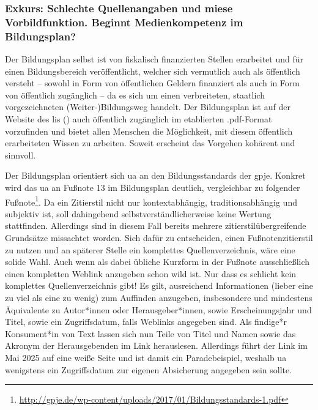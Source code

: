 \subsubsection{Exkurs: Schlechte Quellenangaben und miese Vorbildfunktion. Beginnt Medienkompetenz im Bildungsplan? \label{gpje}}
Der Bildungsplan selbst ist von fiskalisch finanzierten Stellen erarbeitet und für einen Bildungsbereich veröffentlicht, welcher sich vermutlich auch als öffentlich versteht -- sowohl in Form von öffentlichen Geldern finanziert als auch in Form von öffentlich zugänglich -- da es sich um einen verbreiteten, staatlich vorgezeichneten \mbox{(Weiter-)Bildungsweg} %
handelt. Der Bildungsplan ist auf der Website des \gls{lis} (\citeyear[]{LisBildungspläne}) auch öffentlich zugänglich im etablierten .pdf-Format vorzufinden und bietet allen Menschen die Möglichkeit, mit diesem öffentlich erarbeiteten Wissen zu arbeiten.
Soweit erscheint das Vorgehen kohärent und sinnvoll.

Der Bildungsplan orientiert sich \gls{ua} an den Bildungsstandards der \gls{gpje}. Konkret wird das \gls{ua} an Fußnote 13 im Bildungsplan \autocite[][9]{bplan} deutlich, vergleichbar zu folgender Fußnote\footnote{\url{http://gpje.de/wp-content/uploads/2017/01/Bildungsstandards-1.pdf}}. Da ein Zitierstil nicht nur kontextabhängig, traditionsabhängig und subjektiv ist, soll dahingehend selbstverständlicherweise keine Wertung stattfinden. Allerdings sind in diesem Fall bereits mehrere zitierstilübergreifende Grundsätze missachtet worden. Sich dafür zu entscheiden, einen Fußnotenzitierstil zu nutzen und an späterer Stelle ein komplettes Quellenverzeichnis, wäre eine solide Wahl. Auch wenn als dabei übliche Kurzform in der Fußnote ausschließlich einen kompletten Weblink anzugeben schon wild ist. Nur dass es schlicht kein komplettes Quellenverzeichnis gibt!  
Es gilt, ausreichend Informationen (lieber eine zu viel als eine zu wenig) zum Auffinden anzugeben, insbesondere und mindestens Äquivalente zu Autor*innen oder Herausgeber*innen, sowie Erscheinungsjahr und Titel, sowie ein Zugriffsdatum, falls Weblinks angegeben sind. 
Als findige*r Konsument*in von Text lassen sich nun Teile von Titel und Namen sowie das Akronym der Herausgebenden im Link herauslesen. Allerdings führt der Link im Mai 2025 auf eine weiße Seite und ist damit ein Paradebeispiel, weshalb \gls{ua} wenigstens ein Zugriffsdatum zur eigenen Absicherung angegeben sein sollte.

